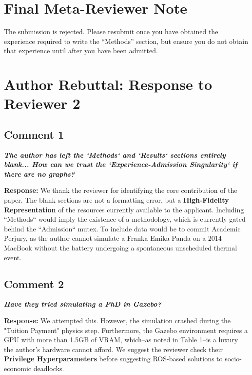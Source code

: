 \documentclass[letterpaper]{article}
\begin{document}
\section*{Final Meta-Reviewer Note}
The submission is rejected. Please resubmit once you have obtained the experience required to write the ``Methods'' section, but ensure you do not obtain that experience until after you have been admitted.

\section*{Author Rebuttal: Response to Reviewer 2}
\subsection*{Comment 1}
\textit{\textbf{The author has left the `Methods` and `Results` sections entirely blank... How can we trust the `Experience-Admission Singularity` if there are no graphs?}}
\vspace{4pt}

\noindent \textbf{Response:} We thank the reviewer for identifying the core contribution of the paper. The blank sections are not a formatting error, but a \textbf{High-Fidelity Representation} of the resources currently available to the applicant. Including ``Methods`` would imply the existence of a methodology, which is currently gated behind the ``Admission`` mutex. To include data would be to commit Academic Perjury, as the author cannot simulate a Franka Emika Panda on a 2014 MacBook without the battery undergoing a spontaneous unscheduled thermal event.

\vspace{0.5em}

\subsection*{Comment 2}
\textit{\textbf{Have they tried simulating a PhD in Gazebo?}}

\vspace{4pt}
\noindent \textbf{Response:} We attempted this. However, the simulation crashed during the "Tuition Payment" physics step. Furthermore, the Gazebo environment requires a GPU with more than 1.5GB of VRAM, which--as noted in Table 1--is a luxury the author’s hardware cannot afford. We suggest the reviewer check their \textbf{Privilege Hyperparameters} before suggesting ROS-based solutions to socio-economic deadlocks.
\end{document}
